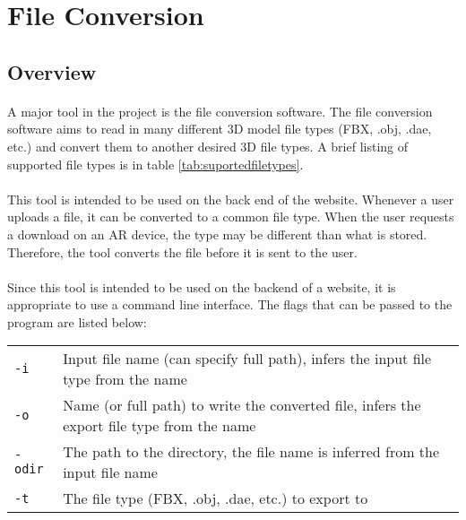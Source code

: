 
 \section{File Conversion}

    \subsection{Overview}
    \paragraph{}
    A major tool in the project is the file conversion software.  
    The file conversion software aims to read in many different 3D model file types (FBX, .obj, .dae, etc.) and convert them to another desired 3D file types.  
    A brief listing of supported file types is in table \ref{tab:suportedfiletypes}.
    
    \paragraph{}
    This tool is intended to be used on the back end of the website.  Whenever a user uploads a file, it can be converted to a common file type.
    When the user requests a download on an AR device, the type may be different than what is stored. Therefore, the tool converts the file before
    it is sent to the user.
    
    \paragraph{}
    Since this tool is intended to be used on the backend of a website, it is appropriate to use a command line interface.  
    The flags that can be passed to the program are listed below:
    
    \begin{table}[h]
        \centering
        \begin{tabular}{l  l}
            \texttt{-i} & Input file name (can specify full path), infers the input file type from the name \\
            \texttt{-o} & Name (or full path) to write the converted file, infers the export file type from the name \\
            \texttt{-odir} & The path to the directory, the file name is inferred from the input file name \\
            \texttt{-t} & The file type (FBX, .obj, .dae, etc.) to export to
        \end{tabular}
    \end{table}
    
